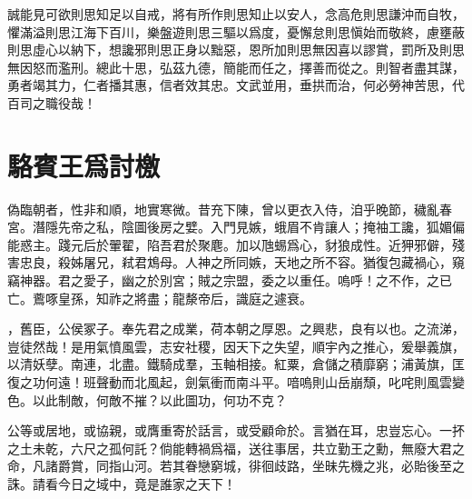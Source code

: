 誠能見可欲則思知足以自戒，將有所作則思知止以安人，念高危則思謙沖而自牧，懼滿溢則思江海下百川，樂盤遊則思三驅以爲度，憂懈怠則思愼始而敬終，慮壅蔽則思虛心以納下，想讒邪則思正身以黜惡，恩所加則思無因喜以謬賞，罰所及則思無因怒而濫刑。總此十思，弘茲九德，簡能而任之，擇善而從之。則智者盡其謀，勇者竭其力，仁者播其惠，信者效其忠。文武並用，垂拱而治，何必勞神苦思，代百司之職役哉！

\theendnotes

\section[爲徐敬業討武曌檄\quad{\small 駱賓王}]{{\normalsize 駱賓王}\quad 爲討檄}
偽臨朝者，性非和順，地實寒微。昔充下陳，曾以更衣入侍，洎乎晚節，穢亂春宮。潛隱先帝之私，陰圖後房之嬖。入門見嫉，蛾眉不肯讓人；掩袖工讒，狐媚偏能惑主。踐元后於翬翟，陷吾君於聚麀。加以虺蜴爲心，豺狼成性。近狎邪僻，殘害忠良，殺姊屠兄，弒君鴆母。人神之所同嫉，天地之所不容。猶復包藏禍心，窺竊神器。君之愛子，幽之於別宮；賊之宗盟，委之以重任。嗚呼！之不作，之已亡。鷰啄皇孫，知祚之將盡；龍漦帝后，識庭之遽衰。

，舊臣，公侯冢子。奉先君之成業，荷本朝之厚恩。之興悲，良有以也。之流涕，豈徒然哉！是用氣憤風雲，志安社稷，因天下之失望，順宇內之推心，爰舉義旗，以清妖孽。南連，北盡。鐵騎成羣，玉軸相接。紅粟，倉儲之積靡窮；浦黃旗，匡復之功何遠！班聲動而北風起，劍氣衝而南斗平。喑嗚則山岳崩頹，叱咤則風雲變色。以此制敵，何敵不摧？以此圖功，何功不克？

公等或居地，或協親，或膺重寄於話言，或受顧命於。言猶在耳，忠豈忘心。一抔之土未乾，六尺之孤何託？倘能轉禍爲福，送往事居，共立勤王之勳，無廢大君之命，凡諸爵賞，同指山河。若其眷戀窮城，徘徊歧路，坐昧先機之兆，必貽後至之誅。請看今日之域中，竟是誰家之天下！ 

